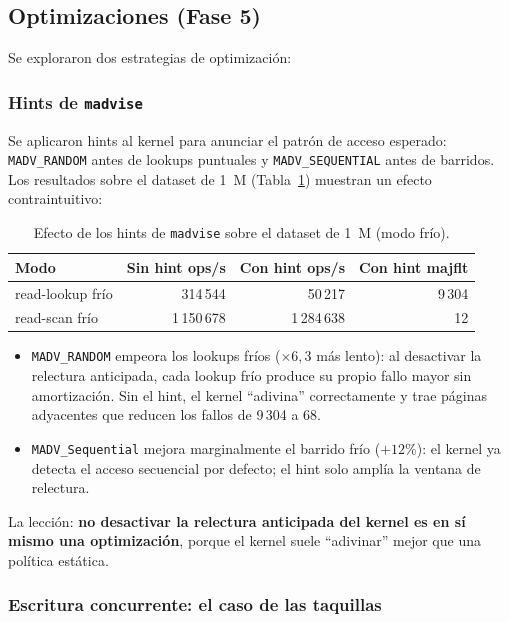 \documentclass[12pt, letterpaper]{article}
\begin{document}
\subsection{Optimizaciones (Fase 5)}

Se exploraron dos estrategias de optimización:

\subsubsection{Hints de \texttt{madvise}}

Se aplicaron hints al kernel para anunciar el patrón de acceso esperado:
\texttt{MADV\_RANDOM} antes de lookups puntuales y \texttt{MADV\_SEQUENTIAL}
antes de barridos. Los resultados sobre el dataset de 1~M (Tabla~\ref{tab:fase5_hints}) muestran un efecto contraintuitivo:

\begin{table}[H]
\centering
\caption{Efecto de los hints de \texttt{madvise} sobre el dataset de 1~M (modo frío).}
\label{tab:fase5_hints}
\begin{tabular}{@{}l r r r@{}}
\toprule
\textbf{Modo} & \textbf{Sin hint ops/s} & \textbf{Con hint ops/s} & \textbf{Con hint majflt} \\
\midrule
read-lookup frío & 314\,544 & 50\,217 & 9\,304 \\
read-scan frío & 1\,150\,678 & 1\,284\,638 & 12 \\
\bottomrule
\end{tabular}
\end{table}

\begin{itemize}
    \item \texttt{MADV\_RANDOM} empeora los lookups fríos ($\times 6{,}3$ más
    lento): al desactivar la relectura anticipada, cada lookup frío produce
    su propio fallo mayor sin amortización. Sin el hint, el kernel
    ``adivina'' correctamente y trae páginas adyacentes que reducen los
    fallos de 9\,304 a 68.
    \item \texttt{MADV\_Sequential} mejora marginalmente el barrido frío
    ($+12$\%): el kernel ya detecta el acceso secuencial por defecto; el
    hint solo amplía la ventana de relectura.
\end{itemize}

La lección: \textbf{no desactivar la relectura anticipada del kernel es en
sí mismo una optimización}, porque el kernel suele ``adivinar'' mejor que
una política estática.

\subsubsection{Escritura concurrente: el caso de las taquillas}
\end{document}
